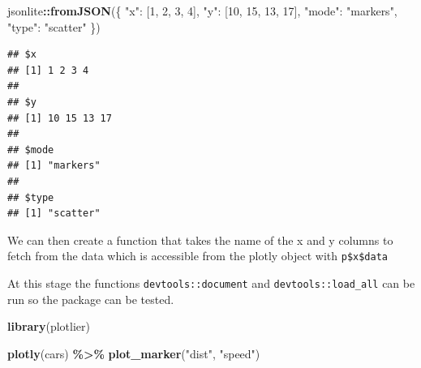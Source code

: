 \documentclass[
]{krantz}
\makeatletter
\newenvironment{Shaded}{\begin{snugshade}}{\end{snugshade}}
\newcommand{\CommentTok}[1]{\textcolor[rgb]{0.37,0.37,0.37}{\textit{#1}}}
\newcommand{\ControlFlowTok}[1]{\textcolor[rgb]{0.27,0.27,0.27}{\textbf{#1}}}
\newcommand{\DataTypeTok}[1]{\textcolor[rgb]{0.27,0.27,0.27}{#1}}
\newcommand{\KeywordTok}[1]{\textcolor[rgb]{0.27,0.27,0.27}{\textbf{#1}}}
\newcommand{\NormalTok}[1]{#1}
\newcommand{\OperatorTok}[1]{\textcolor[rgb]{0.43,0.43,0.43}{\textbf{#1}}}
\newcommand{\StringTok}[1]{\textcolor[rgb]{0.5,0.5,0.5}{#1}}
\newenvironment{kframe}{%
\medskip{}
\setlength{\fboxsep}{.8em}
 \def\at@end@of@kframe{}%
 \ifinner\ifhmode%
  \def\at@end@of@kframe{\end{minipage}}%
  \begin{minipage}{\columnwidth}%
 \fi\fi%
 \def\FrameCommand##1{\hskip\@totalleftmargin \hskip-\fboxsep
 \colorbox{shadecolor}{##1}\hskip-\fboxsep
     \hskip-\linewidth \hskip-\@totalleftmargin \hskip\columnwidth}%
 \MakeFramed {\advance\hsize-\width
   \@totalleftmargin\z@ \linewidth\hsize
   \@setminipage}}%
 {\par\unskip\endMakeFramed%
 \at@end@of@kframe}
\renewenvironment{Shaded}{\begin{kframe}}{\end{kframe}}
\makeatother
\begin{document}
\begin{Shaded}
\begin{Highlighting}[]
\NormalTok{jsonlite}\OperatorTok{::}\KeywordTok{fromJSON}\NormalTok{(}\StringTok{\textquotesingle{}\{}
\StringTok{	"x": [1, 2, 3, 4],}
\StringTok{	"y": [10, 15, 13, 17],}
\StringTok{	"mode": "markers",}
\StringTok{	"type": "scatter"}
\StringTok{\}\textquotesingle{}}\NormalTok{)}
\end{Highlighting}
\end{Shaded}

\begin{verbatim}
## $x
## [1] 1 2 3 4
## 
## $y
## [1] 10 15 13 17
## 
## $mode
## [1] "markers"
## 
## $type
## [1] "scatter"
\end{verbatim}

We can then create a function that takes the name of the x and y columns to fetch from the data which is accessible from the plotly object with \texttt{p\$x\$data}

\begin{Shaded}
\end{Shaded}

At this stage the functions \texttt{devtools::document} and \texttt{devtools::load\_all} can be run so the package can be tested.

\begin{Shaded}
\begin{Highlighting}[]
\KeywordTok{library}\NormalTok{(plotlier)}

\KeywordTok{plotly}\NormalTok{(cars) }\OperatorTok{\%>\%}\StringTok{ }
\StringTok{  }\KeywordTok{plot\_marker}\NormalTok{(}\StringTok{"dist"}\NormalTok{, }\StringTok{"speed"}\NormalTok{)}
\end{Highlighting}
\end{Shaded}
\end{document}
